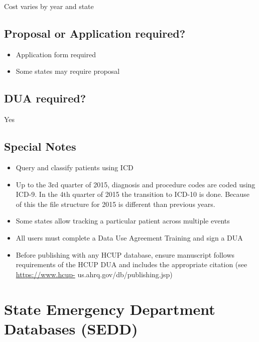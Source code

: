 \documentclass[
]{book}
\providecommand{\tightlist}{%
  \setlength{\itemsep}{0pt}\setlength{\parskip}{0pt}}
\begin{document}
Cost varies by year and state

\hypertarget{proposal-or-application-required-83}{%
\section{Proposal or Application required?}\label{proposal-or-application-required-83}}

\begin{itemize}
\tightlist
\item
  Application form required
\item
  Some states may require proposal
\end{itemize}

\hypertarget{dua-required-83}{%
\section{DUA required?}\label{dua-required-83}}

Yes

\hypertarget{special-notes-83}{%
\section{Special Notes}\label{special-notes-83}}

\begin{itemize}
\tightlist
\item
  Query and classify patients using ICD
\item
  Up to the 3rd quarter of 2015, diagnosis and procedure codes are coded using ICD-9. In the 4th quarter of 2015 the transition to ICD-10 is done. Because of this the file structure for 2015 is different than previous years.
\item
  Some states allow tracking a particular patient across multiple events
\item
  All users must complete a Data Use Agreement Training and sign a DUA
\item
  Before publishing with any HCUP database, ensure manuscript follows requirements of the HCUP DUA and includes the appropriate citation (see \url{https://www.hcup-} us.ahrq.gov/db/publishing.jsp)
\end{itemize}

\mainmatter

\hypertarget{state-emergency-department-databases-sedd}{%
\chapter{State Emergency Department Databases (SEDD)}\label{state-emergency-department-databases-sedd}}
\end{document}
